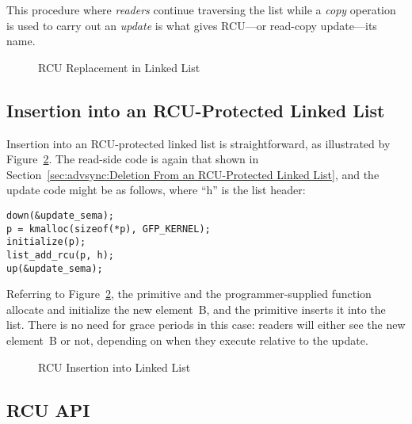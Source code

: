 This procedure where \emph{readers} continue traversing the list
while a \emph{copy} operation is used to carry out an \emph{update}
is what gives RCU---or read-copy update---its name.

\begin{figure}[p]
\centering
{}
\caption{RCU Replacement in Linked List}
\label{fig:advsync:RCU Replacement in Linked List}
\end{figure}

\subsection{Insertion into an RCU-Protected Linked List}
\label{sec:advsync:Insertion into an RCU-Protected Linked List}

Insertion into an RCU-protected linked list is straightforward, as
illustrated by
Figure~\ref{fig:advsync:RCU Insertion into Linked List}.
The read-side code is again that shown in
Section~\ref{sec:advsync:Deletion From an RCU-Protected Linked List},
and the update code might be as follows, where ``h'' is the list header:

\vspace{5pt}
\begin{minipage}[t]{\columnwidth}
\begin{verbatim}
down(&update_sema);
p = kmalloc(sizeof(*p), GFP_KERNEL);
initialize(p);
list_add_rcu(p, h);
up(&update_sema);
\end{verbatim}
\end{minipage}
\vspace{5pt}

Referring to
Figure~\ref{fig:advsync:RCU Insertion into Linked List},
the  primitive and the programmer-supplied 
function allocate and initialize the new element~B,
and the  primitive inserts it into the list.
There is no need for grace periods in this case: readers will either
see the new element~B or not, depending on when they execute relative
to the update.

\begin{figure}[htb]
\centering
{}
\caption{RCU Insertion into Linked List}
\label{fig:advsync:RCU Insertion into Linked List}
\end{figure}

\subsection{RCU API}
\label{sec:advsync:RCU API}

